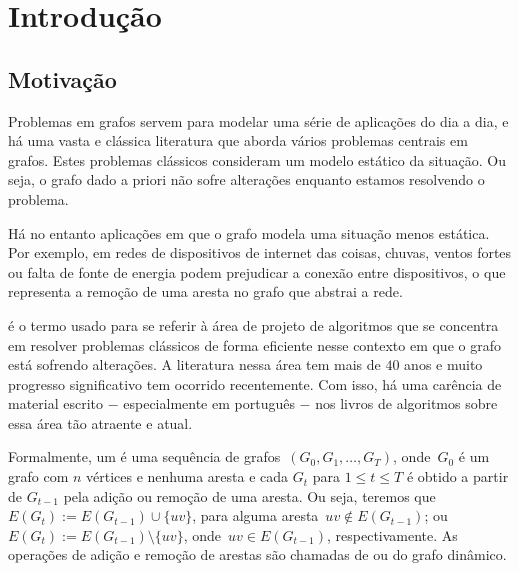\chapter{Introdução}

\section{Motivação}
\label{sec:Motivação}

Problemas em grafos servem para modelar uma série de aplicações do dia a dia,
e há uma vasta e clássica literatura que aborda vários problemas centrais em grafos. Estes problemas clássicos consideram um modelo estático da situação. Ou seja, o grafo dado a priori não sofre alterações enquanto estamos resolvendo o problema.

Há no entanto aplicações em que o grafo modela uma situação menos estática. Por exemplo, em redes de dispositivos de internet das coisas, chuvas, ventos fortes ou falta de fonte de energia podem prejudicar a conexão entre dispositivos, o que representa a remoção de uma aresta no grafo que abstrai a rede.

 é o termo usado para se referir à área de projeto de algoritmos que se concentra em resolver problemas clássicos de forma eficiente nesse contexto em que o grafo está sofrendo alterações. A literatura nessa área tem mais de $40$ anos e muito progresso significativo tem ocorrido recentemente.  Com isso, há uma carência de material escrito $-$ especialmente em português $-$ nos livros de algoritmos sobre essa área tão atraente e atual.

Formalmente, um  é uma sequência de grafos~$(G_0, G_1,\ldots, G_T)$, onde~$G_0$ é um grafo com $n$ vértices e nenhuma aresta e
cada $G_t$ para $1\leq t\leq T$ é obtido a partir de $G_{t-1}$ pela adição ou remoção de uma aresta. Ou seja, teremos que $E(G_t) := E(G_{t-1})\cup \{uv\}$, para alguma aresta~$uv\notin E(G_{t-1})$;
ou $E(G_t) := E(G_{t-1})\setminus \{uv\}$, onde~$uv\in E(G_{t-1})$, respectivamente.
As operações de adição e remoção de arestas são chamadas de  ou  do grafo dinâmico.


